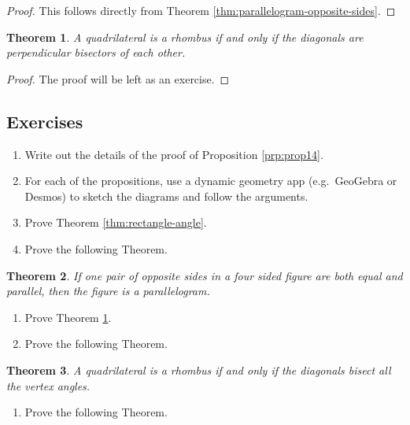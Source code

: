 \documentclass[
]{book}
\providecommand{\tightlist}{%
  \setlength{\itemsep}{0pt}\setlength{\parskip}{0pt}}
\newtheorem{theorem}{Theorem}[chapter]
\theoremstyle{definition}
\theoremstyle{definition}
\theoremstyle{definition}
\theoremstyle{definition}
\theoremstyle{remark}
\begin{document}
\begin{proof}
This follows directly from Theorem \ref{thm:parallelogram-opposite-sides}.
\end{proof}

\begin{theorem}
\protect\hypertarget{thm:rhombus-diagonals}{}\label{thm:rhombus-diagonals}A quadrilateral is a rhombus if and only if the diagonals are perpendicular bisectors of each other.
\end{theorem}

\begin{proof}
The proof will be left as an exercise.
\end{proof}

\hypertarget{exercises-40}{%
\subsection{Exercises}\label{exercises-40}}

\begin{enumerate}
\def\labelenumi{\arabic{enumi}.}
\item
  Write out the details of the proof of Proposition \ref{prp:prop14}.
\item
  For each of the propositions, use a dynamic geometry app (e.g.~GeoGebra or Desmos) to sketch the diagrams and follow the arguments.
\item
  Prove Theorem \ref{thm:rectangle-angle}.
\item
  Prove the following Theorem.
\end{enumerate}

\begin{theorem}
If one pair of opposite sides in a four sided figure are both equal and parallel, then the figure is a parallelogram.
\end{theorem}

\begin{enumerate}
\def\labelenumi{\arabic{enumi}.}
\setcounter{enumi}{4}
\item
  Prove Theorem \ref{thm:rhombus-diagonals}.
\item
  Prove the following Theorem.
\end{enumerate}

\begin{theorem}
A quadrilateral is a rhombus if and only if the diagonals bisect all the vertex angles.
\end{theorem}

\begin{enumerate}
\def\labelenumi{\arabic{enumi}.}
\setcounter{enumi}{6}
\tightlist
\item
  Prove the following Theorem.
\end{enumerate}
\end{document}
